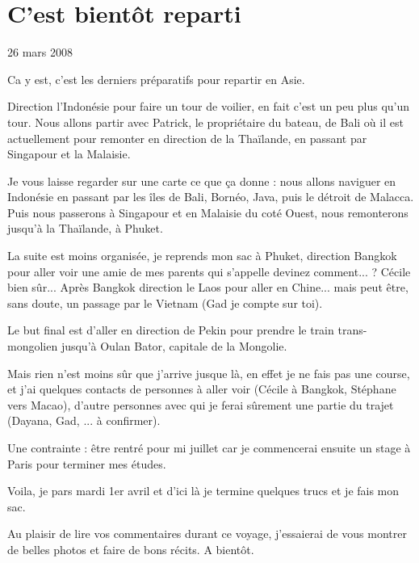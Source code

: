 \section{C'est bientôt reparti}

26 mars 2008

\begin{multicols}{2}

Ca y est, c'est les derniers préparatifs pour repartir en Asie.

Direction l'Indonésie pour faire un tour de voilier, en fait c'est un peu plus qu'un tour. Nous allons partir avec Patrick, le propriétaire du bateau, de Bali où il est actuellement pour remonter en direction de la Thaïlande, en passant par Singapour et la Malaisie.

Je vous laisse regarder sur une carte ce que ça donne : nous allons naviguer en Indonésie en passant par les îles de Bali, Bornéo, Java, puis le détroit de Malacca. Puis nous passerons à Singapour et en Malaisie du coté Ouest, nous remonterons jusqu'à la Thaïlande, à Phuket.


La suite est moins organisée, je reprends mon sac à Phuket, direction Bangkok pour aller voir une amie de mes parents qui s'appelle devinez comment... ? Cécile bien sûr... Après Bangkok direction le Laos pour aller en Chine... mais peut être, sans doute, un passage par le Vietnam (Gad je compte sur toi).

Le but final est d'aller en direction de Pekin pour prendre le train trans-mongolien jusqu'à Oulan Bator, capitale de la Mongolie.

Mais rien n'est moins sûr que j'arrive jusque là, en effet je ne fais pas une course, et j'ai quelques contacts de personnes à aller voir (Cécile à Bangkok, Stéphane vers Macao), d'autre personnes avec qui je ferai sûrement une partie du trajet (Dayana, Gad, ... à confirmer).

Une contrainte : être rentré pour mi juillet car je commencerai ensuite un stage à Paris pour terminer mes études.

Voila, je pars mardi 1er avril et d'ici là je termine quelques trucs et je fais mon sac.

Au plaisir de lire vos commentaires durant ce voyage, j'essaierai de vous montrer de belles photos et faire de bons récits. A bientôt.

\end{multicols}



